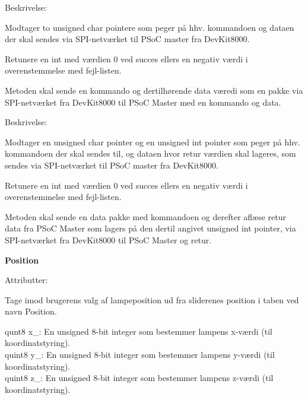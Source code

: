 \begin{labeling}{Beskrivelse:}
\item[int txPacket(unsigned char* const, unsigned char* const)]
\item[Parametre:] Modtager to unsigned char pointere som peger på hhv. kommandoen og dataen der skal sendes via SPI-netværket til PSoC master fra DevKit8000.
\item [Returværdi:] Retunere en int med værdien 0 ved succes ellers en negativ værdi i overenstemmelse med fejl-listen.
\item [Beskrivelse:] Metoden skal sende en kommando og dertilhørende data væredi som en pakke via SPI-netværket fra DevKit8000 til PSoC Master med en kommando og data.
\end{labeling}

\begin{labeling}{Beskrivelse:}
\item[int rxPacket(unsigned char* const, unsigned int*)]
\item[Parametre:] Modtager en unsigned char pointer og en unsigned int pointer som peger på hhv. kommandoen der skal sendes til, og dataen hvor retur værdien skal lageres, som sendes via SPI-netværket til PSoC master fra DevKit8000.
\item [Returværdi:] Retunere en int med værdien 0 ved succes ellers en negativ værdi i overenstemmelse med fejl-listen.
\item [Beskrivelse:] Metoden skal sende en data pakke med kommandoen og derefter aflæse retur data fra PSoC Master som lagers på den dertil angivet unsigned int pointer, via SPI-netværket fra DevKit8000 til PSoC Master og retur.
\end{labeling}

{\centering \textbf{Position} \par}

\begin{labeling}{Attributter:}
\item[Ansvar:] Tage imod brugerens valg af lampeposition ud fra sliderenes position i taben ved navn Position.
\item[Attributter:] qunt8 x\_: En unsigned 8-bit integer som bestemmer lampens x-værdi (til koordinatstyring). \\
quint8 y\_: En unsigned 8-bit integer som bestemmer lampens y-værdi (til koordinatstyring). \\
quint8 z\_: En unsigned 8-bit integer som bestemmer lampens z-værdi (til koordinatstyring).
\end{labeling}

